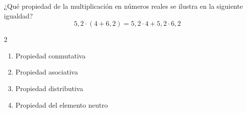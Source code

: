 ¿Qué propiedad de la multiplicación en números reales se ilustra en la siguiente igualdad?
\[
5,2 \cdot (4 + 6,2) = 5,2 \cdot 4 + 5,2 \cdot 6,2
\]
\begin{multicols}{2}
\begin{enumerate}[label=\alph*)]
\item Propiedad conmutativa
\item Propiedad asociativa
\item Propiedad distributiva
\item Propiedad del elemento neutro
\end{enumerate}
\end{multicols}